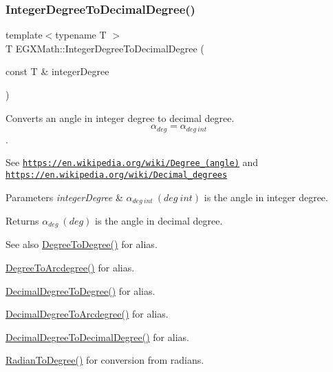 \subsubsection{\texorpdfstring{Integer\+Degree\+To\+Decimal\+Degree()}{IntegerDegreeToDecimalDegree()}}
{\footnotesize\ttfamily template$<$typename T $>$ \\
T E\+G\+X\+Math\+::\+Integer\+Degree\+To\+Decimal\+Degree (\begin{DoxyParamCaption}\item[{const T \&}]{integer\+Degree }\end{DoxyParamCaption})}



Converts an angle in integer degree to decimal degree. \[\alpha_{deg}=\alpha_{deg\ int}\]. 

See \href{https://en.wikipedia.org/wiki/Degree_(angle)}{\tt https\+://en.\+wikipedia.\+org/wiki/\+Degree\+\_\+(angle)} and \href{https://en.wikipedia.org/wiki/Decimal_degrees}{\tt https\+://en.\+wikipedia.\+org/wiki/\+Decimal\+\_\+degrees} 
\begin{DoxyParams}{Parameters}
{\em integer\+Degree} & $\alpha_{deg\ int}\ (deg\ int)$ is the angle in integer degree. \\
\hline
\end{DoxyParams}
\begin{DoxyReturn}{Returns}
$\alpha_{deg}\ (deg)$ is the angle in decimal degree. 
\end{DoxyReturn}
\begin{DoxySeeAlso}{See also}
\mbox{\hyperlink{group___e_g_x_math-_angle_conversions-_degree_gaca157e7d3e99a46a11a04b92680d2574}{Degree\+To\+Degree()}} for alias. 

\mbox{\hyperlink{group___e_g_x_math-_angle_conversions-_degree_gac1b5f3b68f66c77a6df4ceef842c9b19}{Degree\+To\+Arcdegree()}} for alias. 

\mbox{\hyperlink{group___e_g_x_math-_angle_conversions-_decimal_degree_ga0aa7f2f5dbb00cf4ab303421c6e33ccf}{Decimal\+Degree\+To\+Degree()}} for alias. 

\mbox{\hyperlink{group___e_g_x_math-_angle_conversions-_decimal_degree_gacdd463fcabffeb598ebda65b012ce743}{Decimal\+Degree\+To\+Arcdegree()}} for alias. 

\mbox{\hyperlink{group___e_g_x_math-_angle_conversions-_decimal_degree_gafccf9cd779903872887978ab9d79661f}{Decimal\+Degree\+To\+Decimal\+Degree()}} for alias. 

\mbox{\hyperlink{group___e_g_x_math-_angle_conversions-_radian_ga25bbce6cdc1c3621f2a158d320e3bc45}{Radian\+To\+Degree()}} for conversion from radians. 
\end{DoxySeeAlso}
\mbox{\label{group___e_g_x_math-_angle_conversions-_integer_degree_gaa9b63c6095fd7f8809fcfa2ba1e62235}} 
